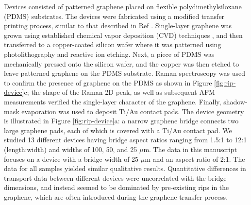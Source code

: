 \documentclass[edeposit,fullpage,draftthesis]{uiucthesis2009}
\begin{document}
        Devices consisted of patterned graphene placed on flexible polydimethylsiloxane
        (PDMS) substrates. The devices were fabricated using a modified transfer
        printing process, similar to that described in Ref \cite{Kim2009}.
        Single-layer graphene was grown using established chemical vapor deposition
        (CVD) techniques \cite{Li2009}, and then transferred to a copper-coated silicon
        wafer where it was patterned using photolithography and reactive ion etching.
        Next, a piece of PDMS was mechanically pressed onto the silicon wafer, and the
        copper was then etched to leave patterned graphene on the PDMS
        substrate\cite{Lee2010}. Raman spectroscopy was used to confirm the presence of
        graphene on the PDMS as shown in Figure \ref{fig:rip-device}c; the shape of the Raman 2D
        peak\cite{Ferrari2006}, as well as subsequent AFM measurements verified the
        single-layer character of the graphene. Finally, shadow-mask evaporation was
        used to deposit Ti/Au contact pads. The device geometry is illustrated in
        Figure \ref{fig:rip-device}a: a narrow graphene bridge connects two large graphene pads, each of
        which is covered with a Ti/Au contact pad. We studied 13 different devices
        having bridge aspect ratios ranging from 1.5:1 to 12:1 (length:width) and
        widths of 100, 50, and 25 $\mu$m. The data in this manuscript focuses on a
        device with a bridge width of 25 $\mu$m and an aspect ratio of 2:1. The data
        for all samples yielded similar qualitative results. Quantitative differences
        in transport data between different devices were uncorrelated with the bridge
        dimensions, and instead seemed to be dominated by pre-existing rips in the
        graphene, which are often introduced during the graphene transfer
        process\cite{Kim2012}.
\end{document}

